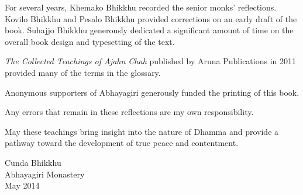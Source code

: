 For several years, Khemako \mbox{Bhikkhu} recorded the senior monks'
reflections. Kovilo \mbox{Bhikkhu} and Pesalo \mbox{Bhikkhu} provided
corrections on an early draft of the book. Suhajjo \mbox{Bhikkhu}
generously dedicated a significant amount of time on the overall book
design and typesetting of the text.


\textit{The Collected Teachings of Ajahn Chah} published by Aruna
Publications in 2011 provided many of the terms in the glossary. 

Anonymous supporters of Abhayagiri generously funded the printing of
this book.

Any errors that remain in these reflections are my own responsibility.

May these teachings bring insight into the nature of Dhamma and provide
a pathway toward the development of true peace and contentment.

{\raggedleft
Cunda Bhikkhu\\Abhayagiri Monastery\\May 2014

}
